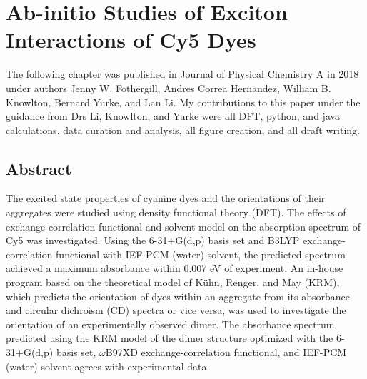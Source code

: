 \chapter{Ab-initio Studies of Exciton Interactions of Cy5 Dyes }
\label{chap:ab-initio}

The following chapter was published in Journal of Physical Chemistry A in 2018 under authors Jenny W. Fothergill, Andres Correa Hernandez, William B. Knowlton, Bernard Yurke, and Lan Li. My contributions to this paper under the guidance from Drs Li, Knowlton, and Yurke were all DFT, python, and java calculations, data curation and analysis, all figure creation, and all draft writing.

\section{Abstract}

The excited state properties of cyanine dyes and the orientations of their aggregates were studied using density functional theory (DFT). The effects of exchange-correlation functional and solvent model on the absorption spectrum of Cy5 was investigated. Using the 6-31+G(d,p) basis set and B3LYP exchange-correlation functional with IEF-PCM (water) solvent, the predicted spectrum achieved a maximum absorbance within 0.007 eV of experiment. An in-house program based on the theoretical model of Kühn, Renger, and May (KRM), which predicts the orientation of dyes within an aggregate from its absorbance and circular dichroism (CD) spectra or vice versa, was used to investigate the orientation of an experimentally observed dimer. The absorbance spectrum predicted using the KRM model of the dimer structure optimized with the 6-31+G(d,p) basis set, $\omega$B97XD exchange-correlation functional, and IEF-PCM (water) solvent agrees with experimental data. 

